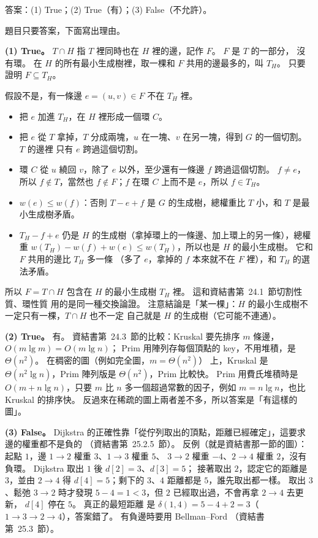 \begin{pastsoln}
答案：(1) True；(2) True（有）；(3) False（不允許）。

題目只要答案，下面寫出理由。

\textbf{(1) True。} $T \cap H$ 指 $T$ 裡同時也在 $H$ 裡的邊，記作 $F$。 $F$ 是 $T$ 的一部分，
沒有環。 在 $H$ 的所有最小生成樹裡，取一棵和 $F$ 共用的邊最多的，叫 $T_H$。 只要證明
$F \subseteq T_H$。

假設不是，有一條邊 $e = (u, v) \in F$ 不在 $T_H$ 裡。
\begin{itemize}
\item 把 $e$ 加進 $T_H$，在 $H$ 裡形成一個環 $C$。
\item 把 $e$ 從 $T$ 拿掉，$T$ 分成兩塊，$u$ 在一塊、$v$ 在另一塊，得到 $G$ 的一個切割。 $T$ 的邊裡
只有 $e$ 跨過這個切割。
\item 環 $C$ 從 $u$ 繞回 $v$，除了 $e$ 以外，至少還有一條邊 $f$ 跨過這個切割。 $f \ne e$，所以
$f \notin T$，當然也 $f \notin F$；$f$ 在環 $C$ 上而不是 $e$，所以 $f \in T_H$。
\item $w(e) \le w(f)$：否則 $T - e + f$ 是 $G$ 的生成樹，總權重比 $T$ 小，和 $T$ 是最小生成樹矛盾。
\item $T_H - f + e$ 仍是 $H$ 的生成樹（拿掉環上的一條邊、加上環上的另一條），總權重
$w(T_H) - w(f) + w(e) \le w(T_H)$，所以也是 $H$ 的最小生成樹。 它和 $F$ 共用的邊比 $T_H$ 多一條
（多了 $e$，拿掉的 $f$ 本來就不在 $F$ 裡），和 $T_H$ 的選法矛盾。
\end{itemize}
所以 $F = T \cap H$ 包含在 $H$ 的最小生成樹 $T_H$ 裡。 這和資結書第~24.1~節切割性質、環性質
用的是同一種交換論證。 注意結論是「某一棵」：$H$ 的最小生成樹不一定只有一棵，$T \cap H$ 也不一定
自己就是 $H$ 的生成樹（它可能不連通）。

\textbf{(2) True。} 有。 資結書第~24.3~節的比較：Kruskal 要先排序 $m$ 條邊，$O(m \lg m) = O(m \lg n)$；
Prim 用陣列存每個頂點的 key，不用堆積，是 $\Theta(n^2)$。 在稠密的圖（例如完全圖，$m = \Theta(n^2)$）
上，Kruskal 是 $\Theta(n^2 \lg n)$，Prim 陣列版是 $\Theta(n^2)$，Prim 比較快。 Prim 用費氏堆積時是
$O(m + n \lg n)$，只要 $m$ 比 $n$ 多一個超過常數的因子，例如 $m = n \lg n$，也比 Kruskal 的排序快。
反過來在稀疏的圖上兩者差不多，所以答案是「有這樣的圖」。

\textbf{(3) False。} Dijkstra 的正確性靠「從佇列取出的頂點，距離已經確定」，這要求邊的權重都不是負的
（資結書第~25.2.5~節）。 反例（就是資結書那一節的圖）：起點 $1$，邊 $1 \to 2$ 權重 $3$、$1 \to 3$ 權重 $5$、
$3 \to 2$ 權重 $-4$、$2 \to 4$ 權重 $2$，沒有負環。 Dijkstra 取出 $1$ 後 $d[2] = 3$、$d[3] = 5$；
接著取出 $2$，認定它的距離是 $3$，並由 $2 \to 4$ 得 $d[4] = 5$；剩下的 $3$、$4$ 距離都是 $5$，誰先取出都一樣。
取出 $3$、鬆弛 $3 \to 2$ 時才發現 $5 - 4 = 1 < 3$，但 $2$ 已經取出過，不會再拿 $2 \to 4$ 去更新，
$d[4]$ 停在 $5$。 真正的最短距離
是 $\delta(1, 4) = 5 - 4 + 2 = 3$（$1 \to 3 \to 2 \to 4$），答案錯了。 有負邊時要用 Bellman--Ford
（資結書第~25.3~節）。
\end{pastsoln}
